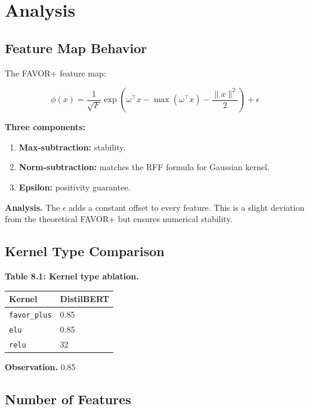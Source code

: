 
\section{Analysis}

\subsection{Feature Map Behavior}

The FAVOR+ feature map:

\[
\phi(x) = \frac{1}{\sqrt{F}} \exp\!\left(\omega^\top x - \max(\omega^\top x) - \frac{\|x\|^2}{2}\right) + \epsilon
\]

\textbf{Three components:}
\begin{enumerate}
\item \textbf{Max-subtraction:} stability.
\item \textbf{Norm-subtraction:} matches the RFF formula for Gaussian kernel.
\item \textbf{Epsilon:} positivity guarantee.

\end{enumerate}
\textbf{Analysis.} The $\epsilon$ adds a constant offset to every feature. This 
is a slight deviation from the theoretical FAVOR+ but ensures numerical 
stability.

\subsection{Kernel Type Comparison}

\textbf{Table 8.1: Kernel type ablation.}

\begin{table}[H]
\centering
\small
\begin{tabular}{ll}
\toprule
\textbf{Kernel} & \textbf{DistilBERT} \\
\midrule
\texttt{favor\_plus} & 0.85 \\
\texttt{elu} & 0.85 \\
\texttt{relu} & 32 \\
\bottomrule
\end{tabular}
\end{table}

\textbf{Observation.} 0.85

\subsection{Number of Features}

